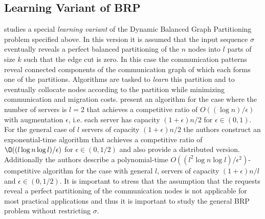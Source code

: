 \documentclass[xcolor=dvipsnames, tikz, 12pt]{article}
\newcommand{\nl}{\newline}
\theoremstyle{definition}
\begin{document}
	\subsection{Learning Variant of BRP}
	\cite{Henzinger2019} studies a special \textit{learning variant} of the Dynamic Balanced Graph Partitioning problem specified above. In this version it is assumed that the input sequence $\sigma$ eventually reveals a perfect balanced partitioning of the $n$ nodes into $l$ parts of size $k$ such that the edge cut is zero. In this case the communication patterns reveal connected components of the communication graph of which each forms one of the partitions. Algorithms are tasked to \textit{learn} this partition and to eventually collocate nodes according to the partition while minimizing communication and migration costs.\nl
	\cite{Henzinger2019} present an algorithm for the case where the number of servers is $l=2$ that achieves a competitive ratio of $O((\log n)/\epsilon)$ with augmentation $\epsilon$, i.e. each server has capacity $(1+\epsilon)n/2$ for $\epsilon\in(0,1)$.\nl
	For the general case of $l$ servers of capacity $(1+\epsilon)n/2$ the authors construct an exponential-time algorithm that achieves a competitive ratio of $\O((l\log n \log l)/\epsilon)$ for $\epsilon\in(0,1/2)$ and also provide a distributed version.\nl
	Additionally the authors describe a polynomial-time $O((l^2\log n\log l)/\epsilon^2)$-competitive algorithm for the case with general $l$, servers of capacity $(1+\epsilon)n/l$ and $\epsilon\in(0,1/2)$.\nl
	It is important to stress that the assumption that the requests reveal a perfect partitioning of the communication nodes is not applicable for most practical applications and thus it is important to study the general BRP problem without restricting $\sigma$.
	
	
\end{document}
